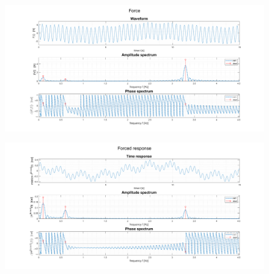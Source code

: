\documentclass[a4paper,12pt,oneside]{article}
\begin{document}
\begin{figure}
	\hspace{-70pt}
	\includegraphics[scale=0.4]{force}
\end{figure}

\begin{figure}
	\hspace{-70pt}
	\includegraphics[scale=0.4]{forced_response}
\end{figure}
\end{document}
